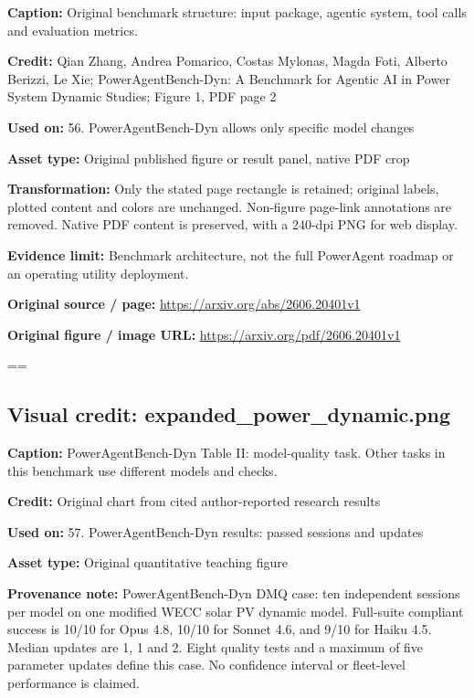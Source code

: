 \documentclass[10pt,letterpaper]{article}
\begin{document}
\textbf{Caption:} Original benchmark structure: input package, agentic system, tool calls and evaluation metrics.\par
\textbf{Credit:} Qian Zhang, Andrea Pomarico, Costas Mylonas, Magda Foti, Alberto Berizzi, Le Xie; PowerAgentBench-Dyn: A Benchmark for Agentic AI in Power System Dynamic Studies; Figure 1, PDF page 2\par
\textbf{Used on:} 56. PowerAgentBench-Dyn allows only specific model changes\par
\textbf{Asset type:} Original published figure or result panel, native PDF crop\par
\textbf{Transformation:} Only the stated page rectangle is retained; original labels, plotted content and colors are unchanged. Non-figure page-link annotations are removed. Native PDF content is preserved, with a 240-dpi PNG for web display.\par
\textbf{Evidence limit:} Benchmark architecture, not the full PowerAgent roadmap or an operating utility deployment.\par
\textbf{Original source / page:} \href{https://arxiv.org/abs/2606.20401v1}{\small\ttfamily https:/\allowbreak{}/\allowbreak{}arxiv.\allowbreak{}org/\allowbreak{}abs/\allowbreak{}2606.\allowbreak{}20401v1}\par
\textbf{Original figure / image URL:} \href{https://arxiv.org/pdf/2606.20401v1}{\small\ttfamily https:/\allowbreak{}/\allowbreak{}arxiv.\allowbreak{}org/\allowbreak{}pdf/\allowbreak{}2606.\allowbreak{}20401v1}\par
\egroup\par\noindent\box\readingEntry\par\medskip
\setbox\readingEntry=\vbox\bgroup\hsize=\linewidth\subsection*{Visual credit: expanded\_power\_dynamic.png}
\textbf{Caption:} PowerAgentBench-Dyn Table II: model-quality task. Other tasks in this benchmark use different models and checks.\par
\textbf{Credit:} Original chart from cited author-reported research results\par
\textbf{Used on:} 57. PowerAgentBench-Dyn results: passed sessions and updates\par
\textbf{Asset type:} Original quantitative teaching figure\par
\textbf{Provenance note:} PowerAgentBench-Dyn DMQ case: ten independent sessions per model on one modified WECC solar PV dynamic model. Full-suite compliant success is 10/10 for Opus 4.8, 10/10 for Sonnet 4.6, and 9/10 for Haiku 4.5. Median updates are 1, 1 and 2. Eight quality tests and a maximum of five parameter updates define this case. No confidence interval or fleet-level performance is claimed.\par
\end{document}
